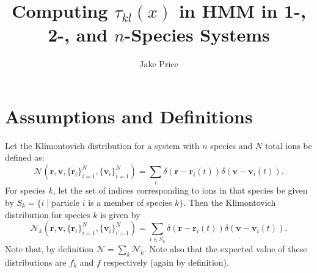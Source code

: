 \documentclass{article}
\title{Computing $\tau_{kl}(x)$ in HMM in 1-, 2-, and $n$-Species Systems}
\author{Jake Price}
\begin{document}
\maketitle



\section{Assumptions and Definitions}

Let the Klimontovich distribution for a system with $n$ species and $N$ total ions be defined as:
\begin{equation}
\mathcal{N}(\mathbf{r},\mathbf{v},\{\mathbf{r}_i\}_{i=1}^N,\{\mathbf{v}_i\}_{i=1}^N)=\sum_i \delta(\mathbf{r}-\mathbf{r}_i(t))\delta(\mathbf{v}-\mathbf{v}_i(t)).
\end{equation}For species $k$, let the set of indices corresponding to ions in that species be given by $S_k=\{i\;|\;$particle $i$ is a member of species $k\}$. Then the Klimontovich distribution for species $k$ is given by
\begin{equation}
\mathcal{N}_k(\mathbf{r},\mathbf{v},\{\mathbf{r}_i\}_{i=1}^N,\{\mathbf{v}_i\}_{i=1}^N)=\sum_{i\in S_k}\delta(\mathbf{r}-\mathbf{r}_i(t))\delta(\mathbf{v}-\mathbf{v}_i(t)).
\end{equation}Note that, by definition $\mathcal{N}=\sum_k \mathcal{N}_k$. Note also that the expected value of these distributions are $f_k$ and $f$ respectively (again by definition).
\end{document}

